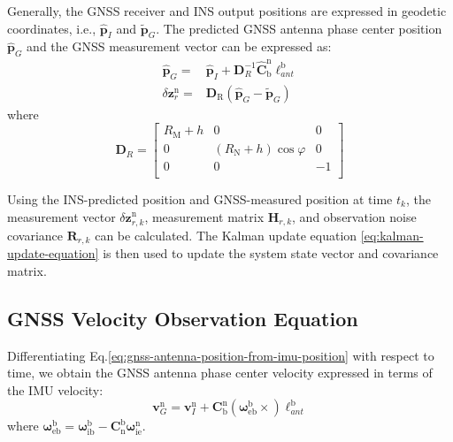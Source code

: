 \documentclass{article}
\begin{document}
Generally, the GNSS receiver and INS output positions are expressed in geodetic coordinates, i.e., $\hat{\boldsymbol{p}}_{I}$ and $\tilde{\boldsymbol{p}}_{G}$. The predicted GNSS antenna phase center position $\hat{\boldsymbol{p}}_{G}$ and the GNSS measurement vector can be expressed as:
\begin{equation}
    \begin{aligned}
        \hat{\boldsymbol{p}}_{G} =& \hat{\boldsymbol{p}}_{I} + \boldsymbol{D}_{R}^{-1} \hat{\mathbf{C}}_{\mathrm{b}}^{\mathrm{n}}\boldsymbol{\ell}_{ant}^{\mathrm{b}} \\
        \delta \boldsymbol{z}_{r}^{\mathrm{n}} =& \boldsymbol{D}_{\mathrm{R}} \left(\hat{\boldsymbol{p}}_{G} - \tilde{\boldsymbol{p}}_{G}\right)
    \end{aligned}
\end{equation}
where
\begin{equation}
    \boldsymbol{D}_{R}=\left[ \begin{matrix}
        {R}_{\mathrm{M}}+{h}&		0&		0\\
        0&		\left( {R}_{\mathrm{N}}+{h} \right) \cos \varphi&		0\\
        0&		0&		-1\\
    \end{matrix} \right] 
\end{equation}

Using the INS-predicted position and GNSS-measured position at time $t_k$, the measurement vector $\delta \boldsymbol{z}_{r,k}^{\mathrm{n}}$, measurement matrix $\boldsymbol{H}_{r,k}$, and observation noise covariance $\boldsymbol{R}_{r,k}$ can be calculated. The Kalman update equation \eqref{eq:kalman-update-equation} is then used to update the system state vector and covariance matrix.

\subsection{GNSS Velocity Observation Equation}

Differentiating Eq.\eqref{eq:gnss-antenna-position-from-imu-position} with respect to time, we obtain the GNSS antenna phase center velocity expressed in terms of the IMU velocity:
\begin{equation}
    \label{eq:gnss-antenna-velocity-from-imu-velocity}
    \boldsymbol{v}_{G}^{\mathrm{n}} = \boldsymbol{v}_{I}^{\mathrm{n}} + \mathbf{C}_{\mathrm{b}}^{\mathrm{n}} \left(\boldsymbol{\omega}_{\mathrm{e} \mathrm{b}}^{\mathrm{b}} \times \right) \boldsymbol{\ell}_{ant}^{\mathrm{b}}
\end{equation}
where $\boldsymbol{\omega}_{\mathrm{e} \mathrm{b}}^{\mathrm{b}} = \boldsymbol{\omega}_{\mathrm{i} \mathrm{b}}^{\mathrm{b}} - \mathbf{C}_{\mathrm{n}}^{\mathrm{b}} \boldsymbol{\omega}_{\mathrm{ie}}^{\mathrm{n}}$. 
\end{document}
